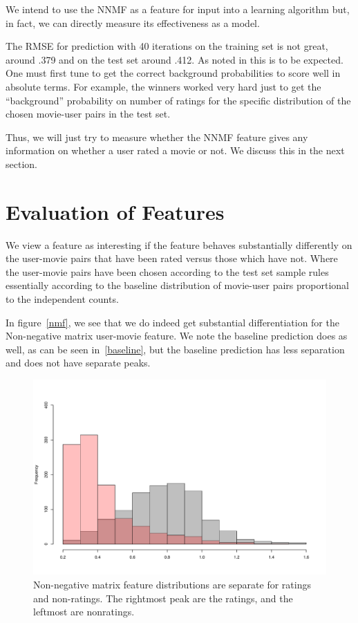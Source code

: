 \documentclass[11pt]{article}
\begin{document}
We intend to use the NNMF as a feature for input into a learning
algorithm but, in fact, we can directly measure its
effectiveness as a model. 

The RMSE for prediction with 40 iterations on the training set is not
great, around .379 and on the test set around .412.  As noted
in \cite{first} this is to be expected.  One must first
tune to get the correct background probabilities to
score well in absolute terms. For example, the winners
worked very hard just to get the ``background'' probability
on number of ratings for the specific distribution
of the chosen movie-user pairs in the test set.

Thus, we will just try to measure whether the NNMF feature 
gives any information on whether a user rated a movie
or not.  We discuss this in the next section.

\section{Evaluation of Features}

We view a feature as interesting if the feature behaves substantially
differently on the user-movie pairs that have been rated
versus those which have not. Where the user-movie pairs
have been chosen according to the test set sample rules
essentially according to the baseline distribution
of movie-user pairs proportional to the independent
counts. 

In figure~\ref{nmf}, we see that we do indeed get substantial 
differentiation for the Non-negative matrix user-movie feature.
We note the baseline prediction does as well, as can be
seen in~\ref{baseline}, but the baseline prediction has
less separation and does not have separate peaks.

\begin{figure}

\includegraphics[scale=.5]{nmf}
\caption{Non-negative matrix feature distributions are separate for ratings and non-ratings. The rightmost
peak are the ratings, and the leftmost are nonratings.}
\end{figure}
\end{document}
